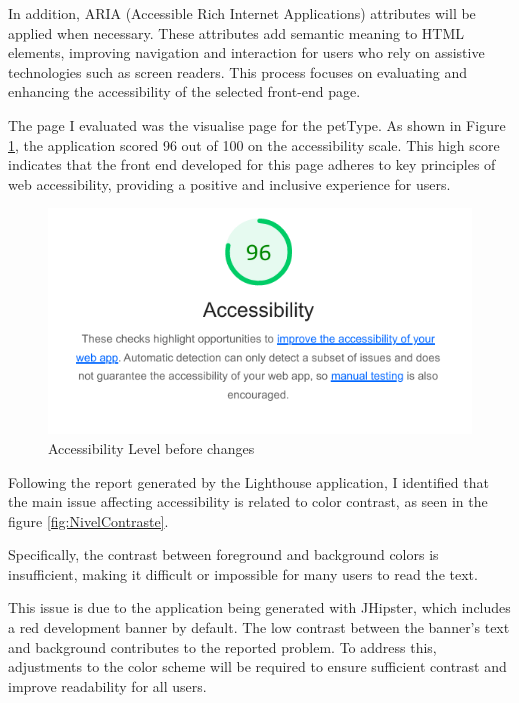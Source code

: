 \documentclass[a4paper,11pt,openright,BCOR=15mm]{scrbook}
\begin{document}
In addition, ARIA (Accessible Rich Internet Applications) attributes will be applied when necessary. These attributes add semantic meaning to HTML elements, improving navigation and interaction for users who rely on assistive technologies such as screen readers. This process focuses on evaluating and enhancing the accessibility of the selected front-end page.

The page I evaluated was the visualise page for the petType. As shown in Figure \ref{fig:NivelAcessibilidade}, the application scored 96 out of 100 on the accessibility scale. This high score indicates that the front end developed for this page adheres to key principles of web accessibility, providing a positive and inclusive experience for users.


\begin{figure}[H]
	\centering
	\includegraphics[width=\textwidth]{figs/Accessibility/NivelAcessibilidade.png}
	\caption{Accessibility Level before changes}
	\label{fig:NivelAcessibilidade}
\end{figure}

Following the report generated by the Lighthouse application, I identified that the main issue affecting accessibility is related to color contrast, as seen in the figure \ref{fig:NivelContraste}. 

Specifically, the contrast between foreground and background colors is insufficient, making it difficult or impossible for many users to read the text.

This issue is due to the application being generated with JHipster, which includes a red development banner by default. The low contrast between the banner's text and background contributes to the reported problem. To address this, adjustments to the color scheme will be required to ensure sufficient contrast and improve readability for all users.
\end{document}

